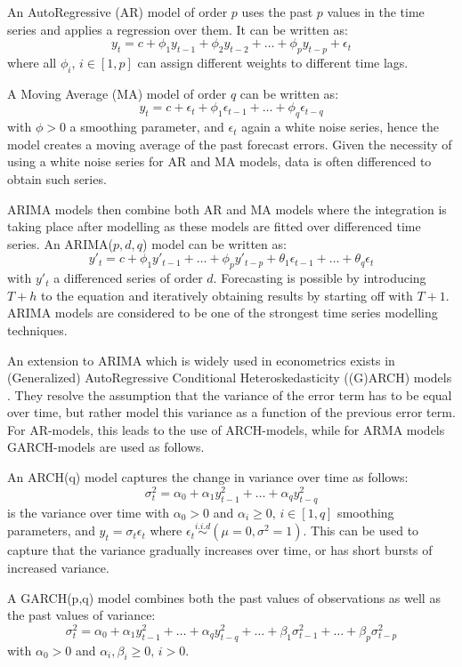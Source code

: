 An AutoRegressive (AR) model of order $p$ uses the past $p$ values in the time series and applies a regression over them. 
It can be written as:
\[y_t=c+\phi_1 y_{t-1} + \phi_2 y_{t-2} + \dots + \phi_p y_{t-p} + \epsilon_t\]
where all $\phi_i,\, i\in[1,p]$ can assign different weights to different time lags.

A Moving Average (MA) model of order $q$ can be written as:
\[y_t=c+\epsilon_t + \phi_1\epsilon_{t-1}+\dots + \phi_q\epsilon_{t-q}\]
with $\phi>0$ a smoothing parameter, and $\epsilon_t$ again a white noise series, hence the model creates a moving average of the past forecast errors.
Given the necessity of using a white noise series for AR and MA models, data is often differenced to obtain such series.

ARIMA models then combine both AR and MA models where the integration is taking place after modelling as these models are fitted over differenced time series. 
An ARIMA($p,d,q$) model can be written as:
\[y'_t=c + \phi_1 y'_{t-1} + \dots + \phi_p y'_{t-p} + \theta_1 \epsilon_{t-1} + \dots + \theta_q \epsilon_t\]
with $y'_t$ a differenced series of order $d$.
Forecasting is possible by introducing $T+h$ to the equation and iteratively obtaining results by starting off with $T+1$.
ARIMA models are considered to be one of the strongest time series modelling techniques.

An extension to ARIMA which is widely used in econometrics exists in (Generalized) AutoRegressive Conditional Heteroskedasticity ((G)ARCH) models \cite{francq2019garch}.
They resolve the assumption that the variance of the error term has to be equal over time, but rather model this variance as a function of the previous error term.
For AR-models, this leads to the use of ARCH-models, while for ARMA models GARCH-models are used as follows.

An ARCH(q) model captures the change in variance over time as follows:
\[\sigma^2_t = \alpha_0 + \alpha_1 y^2_{t-1} + \dots + \alpha_q y^2_{t-q}\] is the variance over time
with $\alpha_0 > 0$ and $\alpha_i\geq 0,\,i\in[1,q]$ smoothing parameters, and $y_t=\sigma_t\epsilon_t$ where $\epsilon_t \overset{i.i.d}{\sim} (\mu=0, \sigma^2=1)$.
This can be used to capture that the variance  gradually increases over time, or has short bursts of increased variance.

A GARCH(p,q) model combines both the past values of observations as well as the past values of variance:
\[\sigma^2_t = \alpha_0 + \alpha_1 y^2_{t-1} + \dots + \alpha_q y^2_{t-q} + \dots + \beta_1\sigma^2_{t-1} + \dots + \beta_p\sigma^2_{t-p}\]
with $\alpha_0 > 0$ and $\alpha_i,\beta_i\geq 0,\,i>0$.

